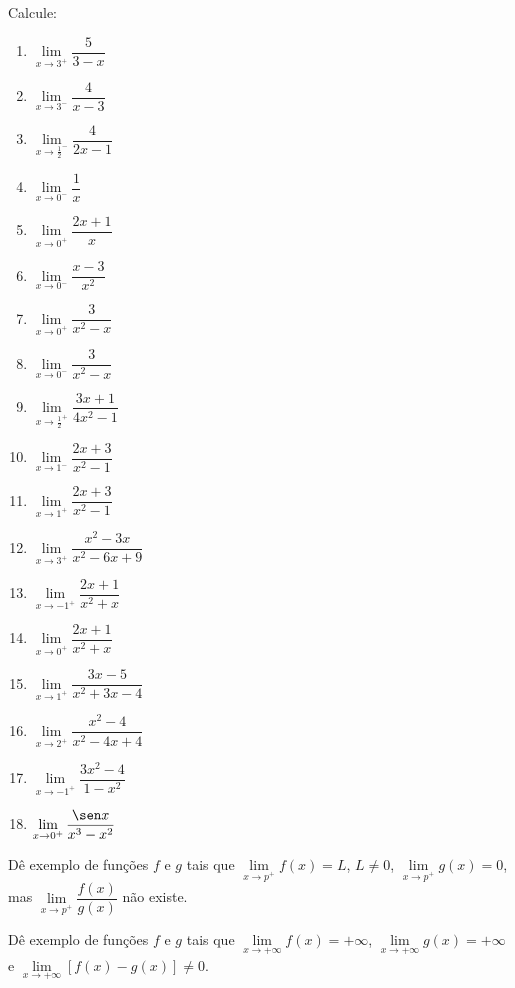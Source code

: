 \begin{exercicio}[4]
Calcule:
\begin{enumerate}[label=\alph*)]
    \item $\lim\limits_{x \to 3^+} \dfrac{5}{3 - x}$
    \item $\lim\limits_{x \to 3^-} \dfrac{4}{x - 3}$
    \item $\lim\limits_{x \to \frac{1}{2}^-} \dfrac{4}{2x - 1}$
    \item $\lim\limits_{x \to 0^-} \dfrac{1}{x}$
    \item $\lim\limits_{x \to 0^+} \dfrac{2x + 1}{x}$
    \item $\lim\limits_{x \to 0^-} \dfrac{x - 3}{x^2}$
    \item $\lim\limits_{x \to 0^+} \dfrac{3}{x^2 - x}$
    \item $\lim\limits_{x \to 0^-} \dfrac{3}{x^2 - x}$
    \item $\lim\limits_{x \to \frac{1}{2}^+} \dfrac{3x + 1}{4x^2 - 1}$
    \item $\lim\limits_{x \to 1^-} \dfrac{2x + 3}{x^2 - 1}$
    \item $\lim\limits_{x \to 1^+} \dfrac{2x + 3}{x^2 - 1}$
    \item $\lim\limits_{x \to 3^+} \dfrac{x^2 - 3x}{x^2 - 6x + 9}$
    \item $\lim\limits_{x \to -1^+} \dfrac{2x + 1}{x^2 + x}$
    \item $\lim\limits_{x \to 0^+} \dfrac{2x + 1}{x^2 + x}$
    \item $\lim\limits_{x \to 1^+} \dfrac{3x - 5}{x^2 + 3x - 4}$
    \item $\lim\limits_{x \to 2^+} \dfrac{x^2 - 4}{x^2 - 4x + 4}$
    \item $\lim\limits_{x \to -1^+} \dfrac{3x^2 - 4}{1 - x^2}$
    \item $\lim\limits_{x \to 0^+} \dfrac{\sen x}{x^3 - x^2}$
\end{enumerate}
\end{exercicio}

\begin{exercicio}[5]
Dê exemplo de funções $f$ e $g$ tais que $\lim\limits_{x \to p^+} f(x) = L$, $L \neq 0$, $\lim\limits_{x \to p^+} g(x) = 0$, mas $\lim\limits_{x \to p^+} \dfrac{f(x)}{g(x)}$ não existe.
\end{exercicio}

\begin{exercicio}[6]
Dê exemplo de funções $f$ e $g$ tais que $\lim\limits_{x \to +\infty} f(x) = +\infty$, $\lim\limits_{x \to +\infty} g(x) = +\infty$ e $\lim\limits_{x \to +\infty} [f(x) - g(x)] \neq 0$.
\end{exercicio}

